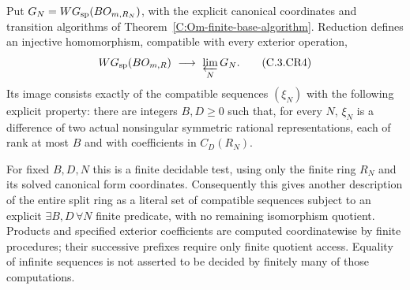 \begin{theorem}
\label{C:complete-finite-bounded-image}
Put
$G_N=WG_{\rm sp}(BO_{m,R_N})$, with the explicit
canonical coordinates and transition algorithms of
Theorem~\ref{C:Om-finite-base-algorithm}.
Reduction defines an injective homomorphism, compatible
with every exterior operation,
\[
 WG_{\rm sp}(BO_{m,R})\ \longrightarrow\
                       \varprojlim_N G_N.                \tag{C.3.CR4}
\]
Its image consists exactly of the compatible sequences
$(\xi_N)$ with the following explicit property:
there are integers $B,D\geq0$ such that, for every $N$,
$\xi_N$ is a difference of two actual nonsingular
symmetric rational representations, each of rank
at most $B$ and with coefficients in $C_D(R_N)$.

For fixed $B,D,N$ this is a finite decidable test,
using only the finite ring $R_N$ and its solved
canonical form coordinates. Consequently this gives
another description of the entire split ring as
a literal set of compatible sequences subject to
an explicit $\exists B,D\,\forall N$ finite predicate,
with no remaining isomorphism quotient.
Products and specified exterior coefficients are
computed coordinatewise by finite procedures;
their successive prefixes require only finite
quotient access. Equality of infinite sequences
is not asserted to be decided by finitely many
of those computations.
\end{theorem}
